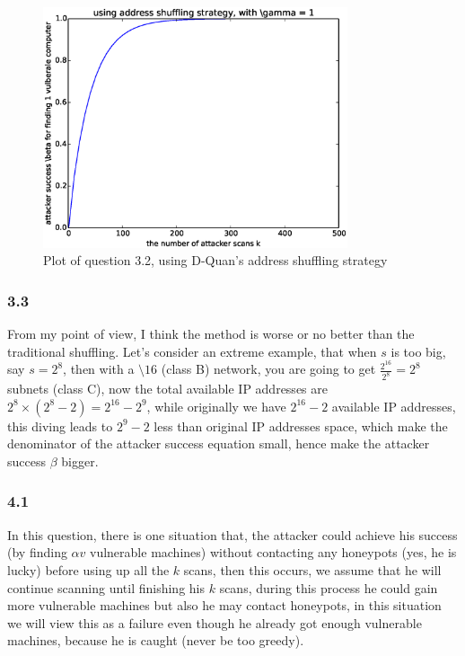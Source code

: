 \documentclass[10pt]{article}
\begin{document}
\begin{figure}[H]
\begin{center}
\includegraphics[width=0.8\textwidth]{figure2.2.orginal.eps}
\caption{Plot of question 3.2, using D-Quan's address shuffling strategy }
\end{center}
\end{figure}


\subsubsection*{3.3}
From my point of view, I think the method is worse or no better than the traditional shuffling. Let's consider an extreme example, that when $s$ is too big, say $s=2^8$, then with a $\setminus 16$ (class B) network, you are going to get $\frac{2^16}{2^8}=2^8$ subnets (class C), now the total available IP addresses are $2^8\times(2^8-2)=2^16-2^9$, while originally we have $2^16-2$ available IP addresses, this diving leads to $2^9-2$ less than original IP addresses space, which make the denominator of the attacker success equation small, hence make the attacker success $\beta$ bigger.


\subsubsection*{4.1}

In this question, there is one situation that, the attacker could achieve his success (by finding $\alpha v$ vulnerable machines) without contacting any honeypots (yes, he is lucky) before using up all the $k$ scans, then this occurs, we assume that he will continue scanning until finishing his $k$ scans, during this process he could gain more vulnerable machines but also he may contact honeypots, in this situation we will view this as a failure even though he already got enough vulnerable machines, because he is caught (never be too greedy). 
\end{document}
